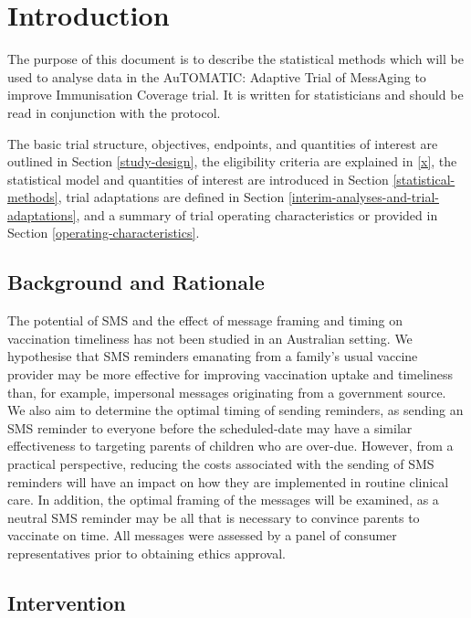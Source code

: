 \documentclass[
  bibliography=totoc]{scrreprt}
\begin{document}
\hypertarget{introduction}{%
\chapter{Introduction}\label{introduction}}

The purpose of this document is to describe the statistical methods which will be used to analyse data in the AuTOMATIC: Adaptive Trial of MessAging to improve Immunisation Coverage trial.
It is written for statisticians and should be read in conjunction with the protocol.

The basic trial structure, objectives, endpoints, and quantities of interest are outlined in Section \ref{study-design}, the eligibility criteria are explained in \ref{x}, the statistical model and quantities of interest are introduced in Section \ref{statistical-methods}, trial adaptations are defined in Section \ref{interim-analyses-and-trial-adaptations}, and a summary of trial operating characteristics or provided in Section \ref{operating-characteristics}.

\hypertarget{background-and-rationale}{%
\section{Background and Rationale}\label{background-and-rationale}}

The potential of SMS and the effect of message framing and timing on vaccination timeliness has not been studied in an Australian setting.
We hypothesise that SMS reminders emanating from a family's usual vaccine provider may be more effective for improving vaccination uptake and timeliness than, for example, impersonal messages originating from a government source.
We also aim to determine the optimal timing of sending reminders, as sending an SMS reminder to everyone before the scheduled-date may have a similar effectiveness to targeting parents of children who are over-due.
However, from a practical perspective, reducing the costs associated with the sending of SMS reminders will have an impact on how they are implemented in routine clinical care.
In addition, the optimal framing of the messages will be examined, as a neutral SMS reminder may be all that is necessary to convince parents to vaccinate on time.
All messages were assessed by a panel of consumer representatives prior to obtaining ethics approval.

\hypertarget{intervention}{%
\section{Intervention}\label{intervention}}
\end{document}
